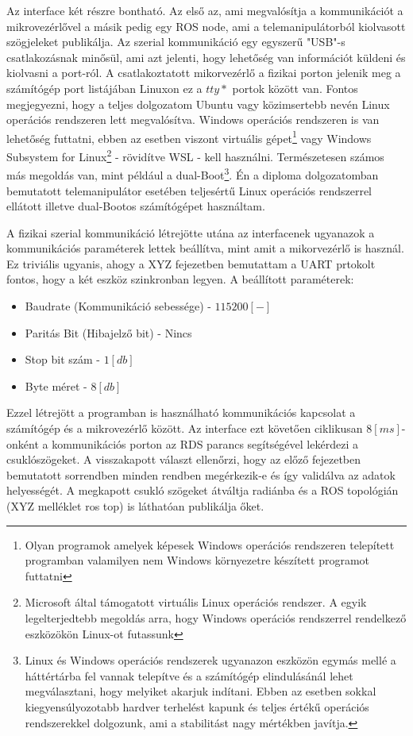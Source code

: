 Az interface két részre bontható. Az első az, ami megvalósítja a kommunikációt a mikrovezérlővel a másik pedig egy ROS node, ami a telemanipulátorból kiolvasott szögjeleket publikálja. Az szerial kommunikáció egy egyszerű "USB"-s csatlakozásnak minősül, ami azt jelenti, hogy lehetőség van információt küldeni és kiolvasni a port-ról. A csatlakoztatott mikorvezérlő a fizikai porton jelenik meg a számítógép port listájában Linuxon ez a $tty*$ portok között van. Fontos megjegyezni, hogy a teljes dolgozatom Ubuntu vagy közimsertebb nevén Linux operációs rendszeren lett megvalósítva. Windows operációs rendszeren is van lehetőség futtatni, ebben az esetben viszont virtuális gépet\footnote{Olyan programok amelyek képesek Windows operációs rendszeren telepített programban valamilyen nem Windows környezetre készített programot futtatni} vagy Windows Subsystem for Linux\footnote{Microsoft által támogatott virtuális Linux operációs rendszer. A egyik legelterjedtebb megoldás arra, hogy Windows operációs rendszerrel rendelkező eszközökön Linux-ot futassunk} - rövidítve WSL - kell használni. Természetesen számos más megoldás van, mint például a dual-Boot\footnote{Linux és Windows operációs rendszerek ugyanazon eszközön egymás mellé a háttértárba fel vannak telepítve és a számítógép elindulásánál lehet megválasztani, hogy melyiket akarjuk indítani. Ebben az esetben sokkal kiegyensúlyozotabb hardver terhelést kapunk és teljes értékű operációs rendszerekkel dolgozunk, ami a stabilitást nagy mértékben javítja.}. Én a diploma dolgozatomban bemutatott telemanipulátor esetében teljesértű Linux operációs rendszerrel ellátott illetve dual-Bootos számítógépet használtam.

A fizikai szerial kommunikáció létrejötte utána az interfacenek ugyanazok a kommunikációs paraméterek lettek beállítva, mint amit a mikorvezérlő is használ. Ez triviális ugyanis, ahogy a XYZ fejezetben bemutattam a UART prtokolt fontos, hogy a két eszköz szinkronban legyen. A beállított paraméterek:

\begin{itemize}
\item Baudrate (Kommunikáció sebessége) - $115200 [-]$
\item Paritás Bit (Hibajelző bit) - Nincs
\item Stop bit szám - $1 [db]$
\item Byte méret - $8[db]$
\end{itemize}

Ezzel létrejött a programban is használható kommunikációs kapcsolat a számítógép és a mikrovezérlő között. Az interface ezt követően ciklikusan $8[ms]$-onként a kommunikációs porton az RDS parancs segítségével lekérdezi a csuklószögeket. A visszakapott választ ellenőrzi, hogy az előző fejezetben bemutatott sorrendben minden rendben megérkezik-e és így validálva az adatok helyességét. A megkapott csukló szögeket átváltja radiánba és a ROS topológián (XYZ melléklet ros top) is láthatóan publikálja őket.

